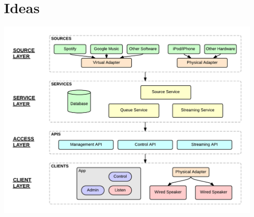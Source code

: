 \section{Ideas}

\begin{minipage}{\linewidth}
  \centering
  \includegraphics[width=1\textwidth]{./img/sys-architecture.png}
\end{minipage}